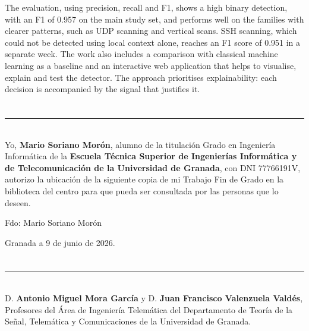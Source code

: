 The evaluation, using precision, recall and F1, shows a high binary detection, with an F1 of 0.957 on the main study set, and performs well on the families with clearer patterns, such as UDP scanning and vertical scans. SSH scanning, which could not be detected using local context alone, reaches an F1 score of 0.951 in a separate week. The work also includes a comparison with classical machine learning as a baseline and an interactive web application that helps to visualise, explain and test the detector. The approach prioritises explainability: each decision is accompanied by the signal that justifies it.
\cleardoublepage

\chapter*{}
\thispagestyle{empty}

\noindent\rule[-1ex]{\textwidth}{2pt}\\[4.5ex]

Yo, \textbf{Mario Soriano Morón}, alumno de la titulación Grado en Ingeniería Informática de la \textbf{Escuela Técnica Superior
de Ingenierías Informática y de Telecomunicación de la Universidad de Granada}, con DNI 77766191V, autorizo la
ubicación de la siguiente copia de mi Trabajo Fin de Grado en la biblioteca del centro para que pueda ser
consultada por las personas que lo deseen.

\vspace{6cm}

\noindent Fdo: Mario Soriano Morón

\vspace{2cm}

\begin{flushright}
Granada a 9 de junio de 2026.
\end{flushright}


\chapter*{}
\thispagestyle{empty}

\noindent\rule[-1ex]{\textwidth}{2pt}\\[4.5ex]

D. \textbf{Antonio Miguel Mora García} y D. \textbf{Juan Francisco Valenzuela Valdés}, Profesores del Área de Ingeniería Telemática del Departamento de Teoría de la Señal, Telemática y Comunicaciones de la Universidad de Granada.


\vspace{0.5cm}

